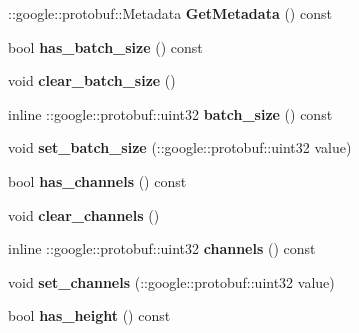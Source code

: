 \begin{DoxyCompactItemize}
\+::google\+::protobuf\+::\+Metadata {\bfseries Get\+Metadata} () const
\item 
\mbox{\label{classcaffe_1_1_memory_data_parameter_ad9d65460d2d852d6393e237a70268e79}} 
bool {\bfseries has\+\_\+batch\+\_\+size} () const
\item 
\mbox{\label{classcaffe_1_1_memory_data_parameter_aa5988fcf8bd10a16c6fb0c52cffb0a18}} 
void {\bfseries clear\+\_\+batch\+\_\+size} ()
\item 
\mbox{\label{classcaffe_1_1_memory_data_parameter_afe8ecf6a64716de0a5083b44276cf667}} 
inline \+::google\+::protobuf\+::uint32 {\bfseries batch\+\_\+size} () const
\item 
\mbox{\label{classcaffe_1_1_memory_data_parameter_a5f193d879b84a411a4a692f5fa9cf97a}} 
void {\bfseries set\+\_\+batch\+\_\+size} (\+::google\+::protobuf\+::uint32 value)
\item 
\mbox{\label{classcaffe_1_1_memory_data_parameter_ac5f3279699126df7b8f92db1174b1859}} 
bool {\bfseries has\+\_\+channels} () const
\item 
\mbox{\label{classcaffe_1_1_memory_data_parameter_aacde7b2756a178e0dcf7b45f22e60d56}} 
void {\bfseries clear\+\_\+channels} ()
\item 
\mbox{\label{classcaffe_1_1_memory_data_parameter_a391df5c3af04c56ce1f48201811e8426}} 
inline \+::google\+::protobuf\+::uint32 {\bfseries channels} () const
\item 
\mbox{\label{classcaffe_1_1_memory_data_parameter_aa95d2cc082ed08595c391da831f5419a}} 
void {\bfseries set\+\_\+channels} (\+::google\+::protobuf\+::uint32 value)
\item 
\mbox{\label{classcaffe_1_1_memory_data_parameter_afc1396e2a80003e3bfce196700a130f5}} 
bool {\bfseries has\+\_\+height} () const
\item 

\end{DoxyCompactItemize}
